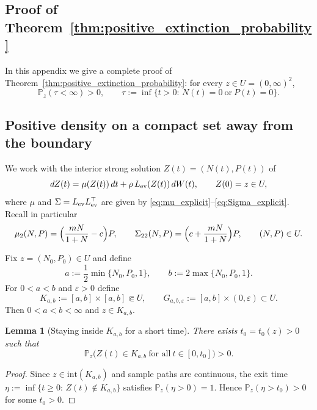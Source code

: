 \documentclass[pdflatex,sn-mathphys-ay]{sn-jnl}
\theoremstyle{thmstyleone}
\newtheorem{lemma}[theorem]{Lemma}
\theoremstyle{definition}
\theoremstyle{remark}
\begin{document}
\begin{appendices}
\section{Proof of Theorem~\ref{thm:positive_extinction_probability}}
\label{app:positive_extinction_probability}

In this appendix we give a complete proof of Theorem~\ref{thm:positive_extinction_probability}:
for every $z\in U=(0,\infty)^2$,
\[
\mathbb P_z(\tau<\infty)>0,
\qquad
\tau:=\inf\{t>0:\,N(t)=0\ \text{or}\ P(t)=0\}.
\]

\subsection{Positive density on a compact set away from the boundary}

We work with the interior strong solution $Z(t)=(N(t),P(t))$ of
\begin{equation}\label{eq:B_SDE}
dZ(t)=\mu(Z(t))\,dt+\rho\,L_{\rm ev}(Z(t))\,dW(t),\qquad Z(0)=z\in U,
\end{equation}
where $\mu$ and $\Sigma=L_{\rm ev}L_{\rm ev}^\top$ are given by \eqref{eq:mu_explicit}--\eqref{eq:Sigma_explicit}.
Recall in particular
\begin{equation}\label{eq:B_predator_coeffs}
\mu_2(N,P)=\Bigl(\frac{mN}{1+N}-c\Bigr)P,
\qquad
\Sigma_{22}(N,P)=\Bigl(c+\frac{mN}{1+N}\Bigr)P,
\qquad (N,P)\in U.
\end{equation}

Fix $z=(N_0,P_0)\in U$ and define
\begin{equation}\label{eq:B_choose_compact}
a:=\frac12\min\{N_0,P_0,1\},\qquad
b:=2\max\{N_0,P_0,1\}.
\end{equation}
For $0<a<b$ and $\varepsilon>0$ define
\[
K_{a,b}:=[a,b]\times[a,b]\Subset U,
\qquad
G_{a,b,\varepsilon}:=[a,b]\times(0,\varepsilon)\subset U.
\]
Then $0<a<b<\infty$ and $z\in K_{a,b}$.

\begin{lemma}[Staying inside $K_{a,b}$ for a short time]\label{lem:B_stay_in_K}
There exists $t_0=t_0(z)>0$ such that
\[
\mathbb P_z\bigl(Z(t)\in K_{a,b}\ \text{for all}\ t\in[0,t_0]\bigr)>0.
\]
\end{lemma}

\begin{proof}
Since $z\in\mathrm{int}(K_{a,b})$ and sample paths are continuous, the exit time
$\eta:=\inf\{t\ge0:\,Z(t)\notin K_{a,b}\}$ satisfies $\mathbb P_z(\eta>0)=1$.
Hence $\mathbb P_z(\eta>t_0)>0$ for some $t_0>0$.
\end{proof}


\end{appendices}
\end{document}
